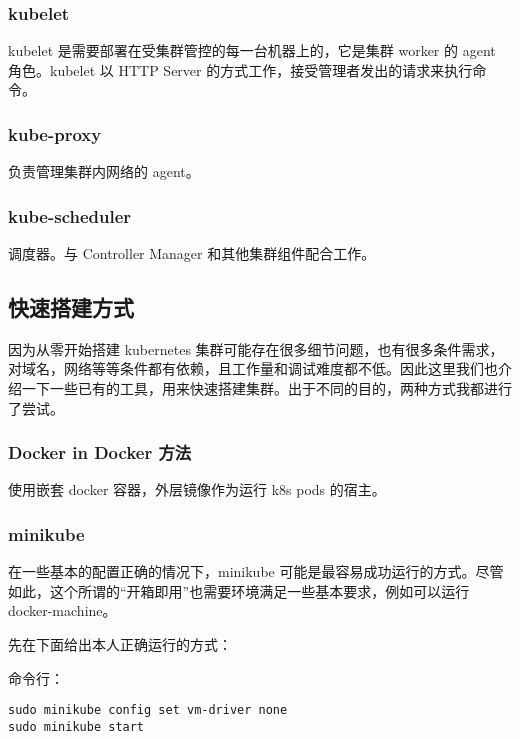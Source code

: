 \subsubsection*{kubelet}

kubelet 是需要部署在受集群管控的每一台机器上的，它是集群 worker 的 agent 角色。kubelet 以 HTTP Server 的方式工作，接受管理者发出的请求来执行命令。

\subsubsection*{kube-proxy}

负责管理集群内网络的 agent。

\subsubsection*{kube-scheduler}

调度器。与 Controller Manager 和其他集群组件配合工作。

\subsection{快速搭建方式}

因为从零开始搭建 kubernetes 集群可能存在很多细节问题，也有很多条件需求，对域名，网络等等条件都有依赖，且工作量和调试难度都不低。因此这里我们也介绍一下一些已有的工具，用来快速搭建集群。出于不同的目的，两种方式我都进行了尝试。

\subsubsection{Docker in Docker 方法}

使用嵌套 docker 容器，外层镜像作为运行 k8s pods 的宿主。

\subsubsection{minikube}

在一些基本的配置正确的情况下，minikube 可能是最容易成功运行的方式。尽管如此，这个所谓的“开箱即用”也需要环境满足一些基本要求，例如可以运行 docker-machine。

先在下面给出本人正确运行的方式：

命令行：

\begin{lstlisting}
sudo minikube config set vm-driver none
sudo minikube start
\end{lstlisting}

